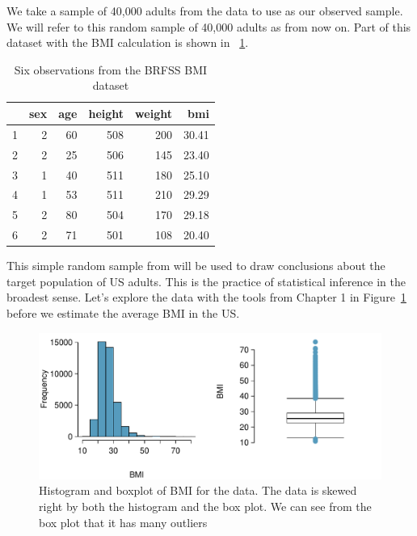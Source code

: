 We take a sample of 40,000 adults from the  data to use as our observed sample. We will refer to this random sample of 40,000 adults as  from now on. Part of this dataset with the BMI calculation is shown in ~\ref{brfssBMIData}. 


\begin{table}[ht]
\centering
\begin{tabular}{rrrrrr}
  \hline
 & sex & age & height & weight & bmi \\ 
  \hline
1 &   2 &  60 & 508 & 200 & 30.41 \\ 
  2 &   2 &  25 & 506 & 145 & 23.40 \\ 
  3 &   1 &  40 & 511 & 180 & 25.10 \\ 
  4 &   1 &  53 & 511 & 210 & 29.29 \\ 
  5 &   2 &  80 & 504 & 170 & 29.18 \\ 
  6 &   2 &  71 & 501 & 108 & 20.40 \\ 
   \hline
\end{tabular}
\caption{Six observations from the BRFSS BMI dataset} 
\label{brfssBMIData}
\end{table}


This simple random sample from  will be used to draw conclusions about the target population of US adults. This is the practice of statistical inference in the broadest sense. Let's explore the data with the tools from Chapter 1 in Figure~\ref{exploreBMI} before we estimate the average BMI in the US. 

\begin{figure}
\centering
\includegraphics[width =  \textwidth]{ch_inference_foundations_oi_biostat/figures/brfssBMIsampHistograms/brfssBMIsampHistograms}
\caption{Histogram and boxplot of BMI for the  data. The data is skewed right by both the histogram and the box plot. We can see from the box plot that it has many outliers}
\label{exploreBMI}
\end{figure}

